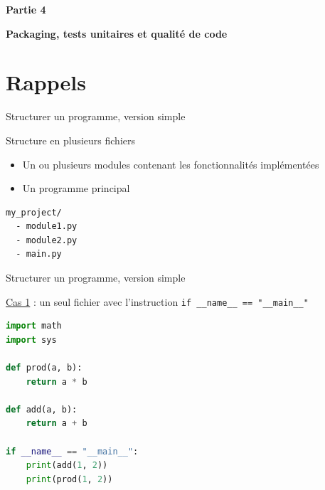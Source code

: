 \documentclass[10pt]{beamer}
\begin{document}
\maketitle

\begin{frame}{}
  \centering
  \Large
  \textbf{Partie 4}

  \textbf{Packaging, tests unitaires et qualité de code}
\end{frame}


\section{Rappels}

\begin{frame}[fragile]{Structurer un programme, version simple}

  \begin{block}{Structure en plusieurs fichiers}
    \begin{itemize}
      \item Un ou plusieurs modules contenant les fonctionnalités implémentées
      \item Un programme principal
    \end{itemize}
  \end{block}

\bigskip

\begin{lstlisting}[numbers=none]
my_project/
  - module1.py
  - module2.py
  - main.py
\end{lstlisting}
\end{frame}


\begin{frame}[fragile]{Structurer un programme, version simple}

  \underline{Cas 1} : un seul fichier avec l'instruction \texttt{if \_\_name\_\_ == "\_\_main\_\_"}

\begin{lstlisting}[language=python, numbers=none]
import math
import sys

def prod(a, b):
    return a * b

def add(a, b):
    return a + b

if __name__ == "__main__":
    print(add(1, 2))
    print(prod(1, 2))
\end{lstlisting} 

\end{frame}
\end{document}
